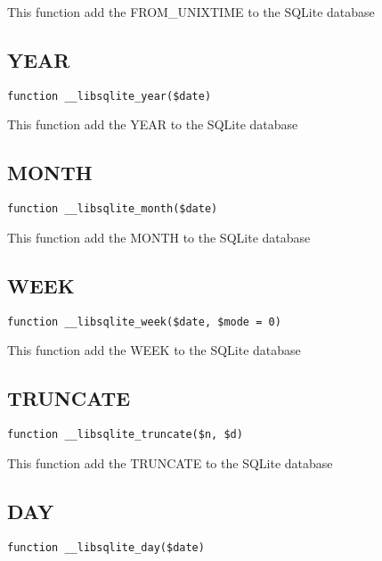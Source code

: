 \documentclass[a4paper]{book}
\begin{document}
This function add the FROM\_UNIXTIME to the SQLite database

\hypertarget{toc339}{}
\subsection{YEAR}

\begin{lstlisting}
function __libsqlite_year($date)
\end{lstlisting}

This function add the YEAR to the SQLite database

\hypertarget{toc340}{}
\subsection{MONTH}

\begin{lstlisting}
function __libsqlite_month($date)
\end{lstlisting}

This function add the MONTH to the SQLite database

\hypertarget{toc341}{}
\subsection{WEEK}

\begin{lstlisting}
function __libsqlite_week($date, $mode = 0)
\end{lstlisting}

This function add the WEEK to the SQLite database

\hypertarget{toc342}{}
\subsection{TRUNCATE}

\begin{lstlisting}
function __libsqlite_truncate($n, $d)
\end{lstlisting}

This function add the TRUNCATE to the SQLite database

\hypertarget{toc343}{}
\subsection{DAY}

\begin{lstlisting}
function __libsqlite_day($date)
\end{lstlisting}
\end{document}
